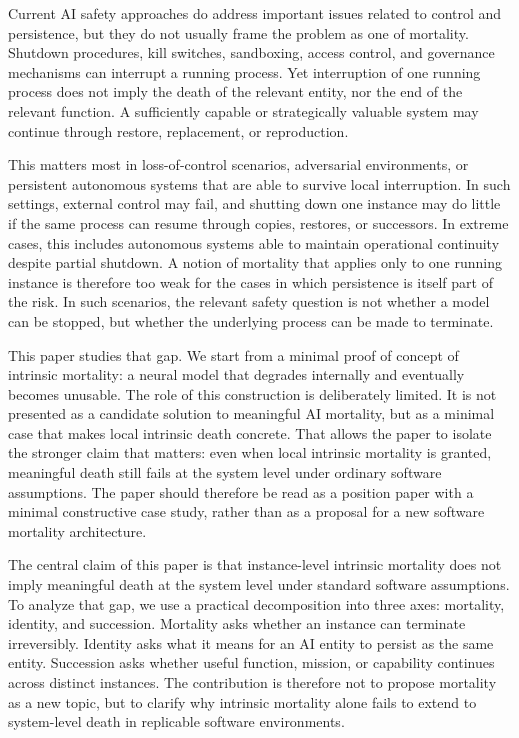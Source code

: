 \documentclass[11pt]{article}
\begin{document}
Current AI safety approaches do address important issues related to control and persistence, but they do not usually frame the problem as one of mortality. Shutdown procedures, kill switches, sandboxing, access control, and governance mechanisms can interrupt a running process. Yet interruption of one running process does not imply the death of the relevant entity, nor the end of the relevant function. A sufficiently capable or strategically valuable system may continue through restore, replacement, or reproduction.

This matters most in loss-of-control scenarios, adversarial environments, or persistent autonomous systems that are able to survive local interruption. In such settings, external control may fail, and shutting down one instance may do little if the same process can resume through copies, restores, or successors. In extreme cases, this includes autonomous systems able to maintain operational continuity despite partial shutdown. A notion of mortality that applies only to one running instance is therefore too weak for the cases in which persistence is itself part of the risk. In such scenarios, the relevant safety question is not whether a model can be stopped, but whether the underlying process can be made to terminate.

This paper studies that gap. We start from a minimal proof of concept of intrinsic mortality: a neural model that degrades internally and eventually becomes unusable. The role of this construction is deliberately limited. It is not presented as a candidate solution to meaningful AI mortality, but as a minimal case that makes local intrinsic death concrete. That allows the paper to isolate the stronger claim that matters: even when local intrinsic mortality is granted, meaningful death still fails at the system level under ordinary software assumptions. The paper should therefore be read as a position paper with a minimal constructive case study, rather than as a proposal for a new software mortality architecture.

The central claim of this paper is that instance-level intrinsic mortality does not imply meaningful death at the system level under standard software assumptions. To analyze that gap, we use a practical decomposition into three axes: mortality, identity, and succession. Mortality asks whether an instance can terminate irreversibly. Identity asks what it means for an AI entity to persist as the same entity. Succession asks whether useful function, mission, or capability continues across distinct instances. The contribution is therefore not to propose mortality as a new topic, but to clarify why intrinsic mortality alone fails to extend to system-level death in replicable software environments.
\end{document}
